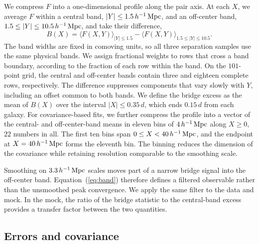We compress $F$ into a one-dimensional profile along the pair axis. At each
$X$, we average $F$ within a central band, $|Y|\leq1.5\,h^{-1}\,{\rm Mpc}$, and an
off-center band, $1.5\leq|Y|\leq10.5\,h^{-1}\,{\rm Mpc}$, and take their difference,
\begin{equation}
  B(X) = \langle F(X,Y)\rangle_{|Y|\leq1.5}
       - \langle F(X,Y)\rangle_{1.5\leq|Y|\leq10.5}.
  \label{eq:band}
\end{equation}
The band widths are fixed in comoving units, so all three separation samples
use the same physical bands. We assign fractional weights to rows that cross
a band boundary, according to the fraction of each row within the band. On
the $101$-point grid, the central and off-center bands contain three and
eighteen complete rows, respectively. The difference suppresses components
that vary slowly with $Y$, including an offset common to both bands. We
define the bridge excess as the mean of $B(X)$ over the interval
$|X|\leq0.35\,d$, which ends $0.15\,d$ from each galaxy. For
covariance-based fits, we further compress the profile into a vector of the
central- and off-center-band means in eleven bins of
$4\,h^{-1}\,{\rm Mpc}$ along $X\geq0$, $22$ numbers in all. The first ten bins span
$0\leq X<40\,h^{-1}\,{\rm Mpc}$, and the endpoint at $X=40\,h^{-1}\,{\rm Mpc}$ forms the
eleventh bin. The binning reduces the dimension of the covariance while
retaining resolution comparable to the smoothing scale.

Smoothing on $3.3\,h^{-1}\,{\rm Mpc}$ scales moves part of a narrow bridge signal into
the off-center band. Equation~(\ref{eq:band}) therefore defines a filtered
observable rather than the unsmoothed peak convergence. We apply the same
filter to the data and mock. In the mock, the ratio of the bridge statistic
to the central-band excess provides a transfer factor between the two
quantities.

\subsection{Errors and covariance}
\label{sec:errors}


